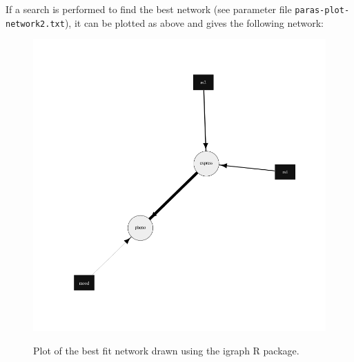 \documentclass[a4paper,12pt]{article}
\newcommand{\code}[1]{{\footnotesize{{\tt #1}}}}
\begin{document}
If a search is performed to find the best network (see parameter file \code{paras-plot-network2.txt}), it can be plotted as above and gives the following network: 
{\begin{figure}[ht]
{\begin{center}
{\includegraphics[width=400pt]{exampleGraph2.png}}
\caption{Plot of the best fit network drawn using the igraph R package.}
\label{plot2-fig}
\end{center}}
\end{figure}
}






\end{document}
